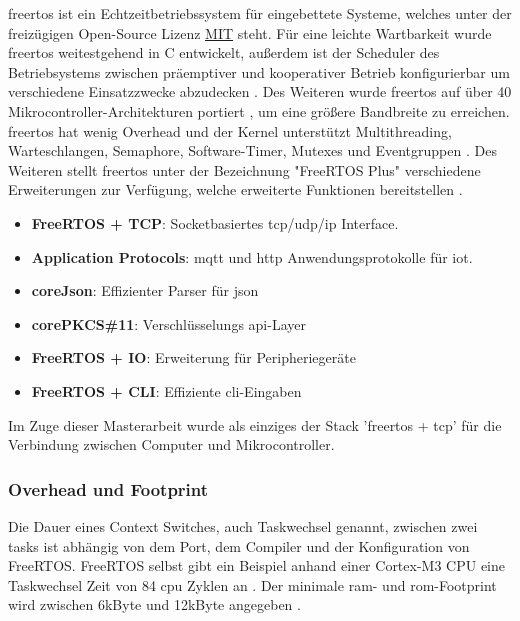 \documentclass[../EDF Master Thesis.tex]{subfiles}
\begin{document}
\ac{freertos} ist ein Echtzeitbetriebssystem für eingebettete Systeme, welches unter der freizügigen Open-Source Lizenz \href{https://de.wikipedia.org/wiki/MIT-Lizenz}{MIT} steht.
Für eine leichte Wartbarkeit wurde \ac{freertos} weitestgehend in C entwickelt, außerdem ist der Scheduler des Betriebsystems zwischen präemptiver und kooperativer Betrieb konfigurierbar um verschiedene Einsatzzwecke abzudecken \parencite{wiki:002}.
Des Weiteren wurde \ac{freertos} auf über 40 Mikrocontroller-Architekturen portiert \parencite{freertos}, um eine größere Bandbreite zu erreichen.
\ac{freertos} hat wenig Overhead und der Kernel unterstützt Multithreading, Warteschlangen, Semaphore, Software-Timer, Mutexes und Eventgruppen \parencite{freertos-features}.
Des Weiteren stellt \ac{freertos} unter der Bezeichnung "FreeRTOS Plus" verschiedene Erweiterungen zur Verfügung, welche erweiterte Funktionen bereitstellen \parencite{freertos-extensions}.
\begin{itemize}
    \item \textbf{FreeRTOS + TCP}: Socketbasiertes \acs{tcp}/\acs{udp}/\acs{ip} Interface.
    \item \textbf{Application Protocols}: \acs{mqtt} und \acs{http} Anwendungsprotokolle für \acs{iot}.
    \item \textbf{coreJson}: Effizienter Parser für \acs{json}
    \item \textbf{corePKCS\#11}: Verschlüsselungs \acs{api}-Layer
    \item \textbf{FreeRTOS + IO}: Erweiterung für Peripheriegeräte
    \item \textbf{FreeRTOS + CLI}: Effiziente \acs{cli}-Eingaben
\end{itemize}

Im Zuge dieser Masterarbeit wurde als einziges der Stack '\ac{freertos} + \acs{tcp}' für die Verbindung zwischen Computer und Mikrocontroller.

\subsubsection{Overhead und Footprint}
Die Dauer eines Context Switches, auch Taskwechsel genannt, zwischen zwei tasks ist abhängig von dem Port, dem Compiler und der Konfiguration von FreeRTOS.
FreeRTOS selbst gibt ein Beispiel anhand einer Cortex-M3 CPU eine Taskwechsel Zeit von 84 \ac{cpu} Zyklen an \parencite{freertos-overhead}.
Der minimale \ac{ram}- und \ac{rom}-Footprint wird zwischen 6kByte und 12kByte angegeben \parencite{freertos-footprint}.
\end{document}
